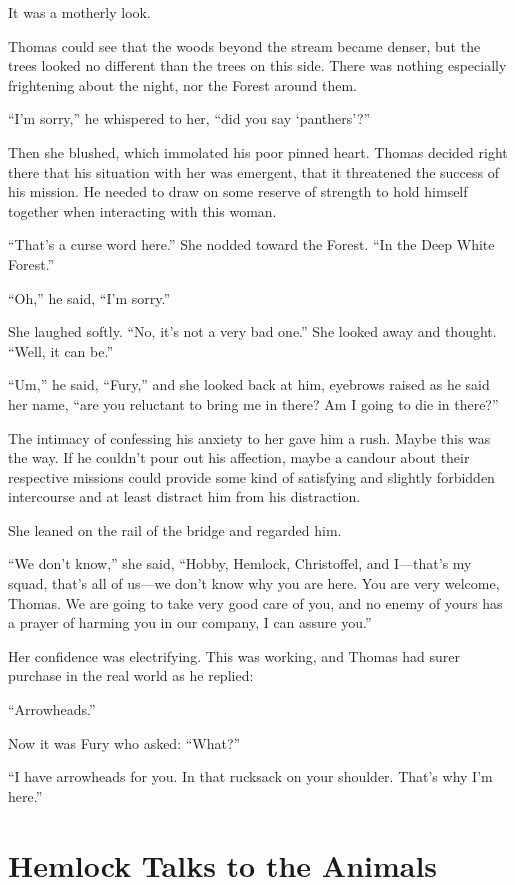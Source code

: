 \documentclass[11pt,a5paper]{article}
\begin{document}
It was a motherly look.

Thomas could see that the woods beyond the stream became denser, but the trees looked no different than the trees on this side. There was nothing especially  frightening about the night, nor the Forest around them.

``I'm sorry,'' he whispered to her, ``did you say `panthers'?''

Then she blushed, which immolated his poor pinned heart. Thomas decided right there that his situation with her was emergent, that it threatened the success of his mission. He needed to draw on some reserve of strength to hold himself together when interacting with this woman.

``That's a curse word here.'' She nodded toward the Forest. ``In the Deep White Forest.''

``Oh,'' he said, ``I'm sorry.''

She laughed softly. ``No, it's not a very bad one.'' She looked away and thought. ``Well, it can be.''

``Um,'' he said, ``Fury,'' and she looked back at him, eyebrows raised as he said her name, ``are you reluctant to bring me in there? Am I going to die in there?''

The intimacy of confessing his anxiety to her gave him a rush. Maybe this was the way. If he couldn't pour out his affection, maybe a candour about their respective missions could provide some kind of satisfying and slightly forbidden intercourse and at least distract him from his distraction. 

She leaned on the rail of the bridge and regarded him.

``We don't know,'' she said, ``Hobby, Hemlock, Christoffel, and I---that's my squad, that's all of us---we don't know why you are here. You are very welcome, Thomas. We are going to take very good care of you, and no enemy of yours has a prayer of harming you in our company, I can assure you.''

Her confidence was electrifying. This was working, and Thomas had surer purchase in the real world as he replied:

``Arrowheads.''

Now it was Fury who asked: ``What?''

``I have arrowheads for you. In that rucksack on your shoulder. That's why I'm here.''

\newpage

\section{Hemlock Talks to the Animals}
\end{document}
